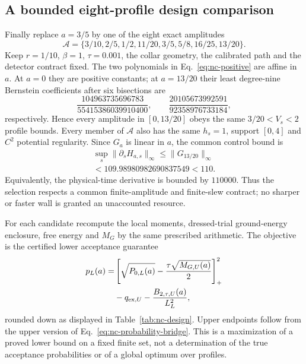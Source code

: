 \documentclass[aps,pra,reprint,superscriptaddress,longbibliography]{revtex4-2}
\begin{document}
\subsection{A bounded eight-profile design comparison}

Finally replace $a=3/5$ by one of the eight exact amplitudes
\begin{equation}
 \mathcal A=\{3/10,2/5,1/2,11/20,3/5,5/8,16/25,13/20\}.
 \label{eq:nc-design-set}
\end{equation}
Keep $r=1/10$, $\beta=1$, $\tau=0.001$, the collar geometry,
the calibrated path and the detector contract fixed.
The two polynomials in Eq.~\eqref{eq:nc-positive} are affine in
$a$.  At $a=0$ they are positive constants; at $a=13/20$ their
least degree-nine Bernstein coefficients after six bisections are
\begin{equation}
 \frac{104963735696783}{55415386039910400},\qquad
 \frac{20105673992591}{92358976733184},
 \label{eq:nc-design-positivity}
\end{equation}
respectively.  Hence every amplitude in $[0,13/20]$ obeys the same
$3/20<V_s<2$ profile bounds.  Every member of $\mathcal A$ also has
the same $h_s=1$, support $[0,4]$ and $C^2$ potential regularity.
Since $G_a$ is linear in $a$, the common control bound is
\begin{equation}
 \begin{gathered}
 \sup_s\|\partial_sH_{a,s}\|_\infty
 \le\|G_{13/20}\|_\infty\\
 <109.98980982690837549<110.
 \end{gathered}
 \label{eq:nc-design-slew}
\end{equation}
Equivalently, the physical-time derivative is bounded by $110000$.
Thus the selection respects a common finite-amplitude and finite-slew
contract; no sharper or faster wall is granted an unaccounted resource.

For each candidate recompute the local moments, dressed-trial
ground-energy enclosure, free energy and $M_G$ by the same prescribed
arithmetic.  The objective is the certified lower acceptance guarantee
\begin{equation}
 \begin{aligned}
 p_L(a)=
 &\left[\sqrt{P_{0,L}(a)}-\frac{\tau\sqrt{M_{G,U}(a)}}2\right]_+^2\\
 &-q_{{\rm ex},U}-\frac{B_{2,\tau,U}(a)}{L_L^2},
 \end{aligned}
 \label{eq:nc-design-objective}
\end{equation}
rounded down as displayed in Table~\ref{tab:nc-design}.
Upper endpoints follow from the upper version of
Eq.~\eqref{eq:nc-probability-bridge}.
This is a maximization of a proved lower bound on a fixed finite set,
not a determination of the true acceptance probabilities or of a
global optimum over profiles.
\end{document}
